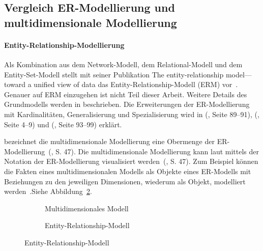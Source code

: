 \documentclass[
  language=german, %
  type=bachelor%
]{isthesis}
\begin{document}
\begin{content}
  \subsection{Vergleich \acrshort{ER}-Modellierung und multidimensionale Modellierung}

  \paragraph{Entity-Relationship-Modellierung} Als Kombination aus dem
  Network-Modell, dem Relational-Modell und dem Entity-Set-Modell stellt
  \textsc{\citeauthor{chen1976entity}} \citeyear{chen1976entity} mit seiner
  Publikation \glqq{}The entity-relationship model—toward a unified view of
  data\grqq{} das Entity-Relationship-Modell (\acrshort{ERM}) vor~\cite[][S.
  2]{chen1976entity}.  Genauer auf \acrshort{ERM} einzugehen ist nicht Teil
  dieser Arbeit. Weitere Details des Grundmodells werden in
  \textsc{\cite{chen1976entity}} beschrieben. Die Erweiterungen der
  ER-Modellierung mit Kardinalitäten, Generalisierung und Spezialisierung wird
  in \textsc{\citeauthor{becker2004handelsinformationssysteme}}
  (\citeyear{becker2004handelsinformationssysteme}, Seite 89--91),
  \textsc{\citeauthor{becker2012grundsatze}} (\citeyear{becker2012grundsatze},
  Seite 4--9) und \textsc{\citeauthor{schutte2013grundsatze}}
  (\citeyear{schutte2013grundsatze}, Seite 93--99) erklärt.

  \textsc{\citeauthor{ballard1998data}} bezeichnet die multidimensionale
  Modellierung eine Obermenge der ER-Modellierung~(\citeyear{ballard1998data},
  S. 47). Die multidimensionale Modellierung kann laut
  \textsc{\citeauthor{ballard1998data}} mittels der Notation der
  ER-Modellierung visualisiert werden~(\citeyear{ballard1998data}, S. 47). Zum
  Beispiel können die Fakten eines multidimensionalen Modells als Objekte eines
  ER-Modells mit Beziehungen zu den jeweiligen Dimensionen, wiederum als
  Objekt, modelliert werden~\cite[][S.  48]{ballard1998data}.Siehe
  Abbildung~\ref{vergleich-erm}.

  \begin{figure}[caption={Vergleich multidimensionale Modellierung und ERM}, label={}]
    \centering
    \begin{subfigure}{.49\textwidth}
      \centering
      \resizebox{\linewidth}{!}{}
      \caption{Multidimensionales Modell}
    \end{subfigure}
    \begin{subfigure}{.49\textwidth}
      \centering
      \resizebox{\linewidth}{!}{}
      \caption{Entity-Relationship-Modell}\label{vergleich-erm}
    \end{subfigure}
  \end{figure}


\end{content}
\end{document}
